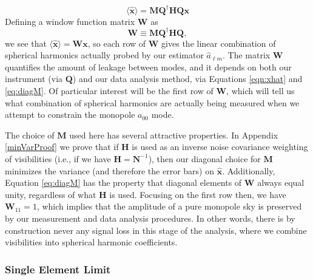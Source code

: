 \documentclass[twocolumn,apj,numberedappendix]{emulateapj}
\newcommand{\x}{\mathbf{x}}
\newcommand{\xhat}{\hat{\mathbf{x}}}
\newcommand{\N}{\mathbf{N}}
\newcommand{\Hmat}{\mathbf{H}}
\newcommand{\Q}{\mathbf{Q}}
\newcommand{\M}{\mathbf{M}}
\newcommand{\W}{\mathbf{W}}
\newcommand{\acl}[1]{{\color{red} \textbf{[ACL:  #1]}}}
\newcommand{\mep}[1]{{\color{applegreen} \textbf{[MEP:  #1]}}}
\begin{document}
\begin{equation}
\langle \xhat \rangle = \M \Q^\dagger \Hmat \Q \x
\end{equation}
Defining a window function matrix $\W$ as 
\begin{equation}
\W \equiv \M \Q^\dagger \Hmat \Q,
\label{eq:Wform}
\end{equation}
we see that $\langle \xhat \rangle  = \W \mathbf{x}$, so each row of $\W$ gives the linear combination of spherical harmonics actually probed by our estimator $\hat{a}_{\ell m}$. The matrix $\W$ quantifies the amount of leakage between modes, and it depends on both our instrument (via $\Q$) and our data analysis method, via Equations \eqref{eqn:xhat} and \eqref{eq:diagM}. Of particular interest will be the first row of $\W$, which will tell us what combination of spherical harmonics are actually being measured when we attempt to constrain the monopole $a_{00}$ mode.

The choice of $\M$ used here has several attractive properties. In Appendix \ref{minVarProof} we prove that if $\Hmat$ is used as an inverse noise covariance weighting of visibilities (i.e., if we have $\Hmat = \N^{-1}$), then our diagonal choice for $\M$ minimizes the variance (and therefore the error bars) on $\mathbf{\hat{x}}$. Additionally, Equation \eqref{eq:diagM} has the property that diagonal elements of $\W$ always equal unity, regardless of what $\Hmat$ is used. Focusing on the first row then, we have $\W_{11} =1$, which implies that the amplitude of a pure monopole sky is preserved by our measurement and data analysis procedures. In other words, there is by construction never any signal loss in this stage of the analysis, where we combine visibilities into spherical harmonic coefficients.
%
%

\subsubsection{Single Element Limit}
\end{document}
